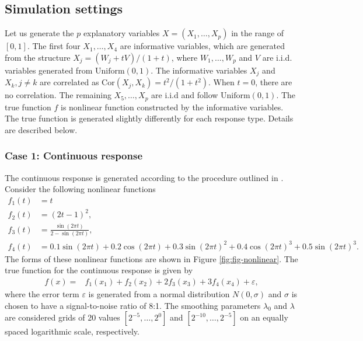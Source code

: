 \hypertarget{ssec5.1}{%
\subsection{Simulation settings}\label{ssec5.1}}

Let us generate the \(p\) explanatory variables \(X = (X_1, \dots, X_p)\) in the range of \([0,1]\). The first four \(X_1, \dots, X_4\) are informative variables, which are generated from the structure \(X_j = (W_j + tV) / (1 + t)\), where \(W_1, \dots, W_p\) and \(V\) are i.i.d. variables generated from \(\text{Uniform}(0, 1)\). The informative variables \(X_j\) and \(X_k, j \neq k\) are correlated as \(\text{Cor}(X_j,X_k)=t^2/(1+t^2)\). When \(t=0\), there are no correlation. The remaining \(X_5, \dots, X_p\) are i.i.d and follow \(\text{Uniform}(0, 1)\). The true function \(f\) is nonlinear function constructed by the informative variables. The true function is generated slightly differently for each response type. Details are described below.

\hypertarget{case-1-continuous-response}{%
\subsubsection{Case 1: Continuous response}\label{case-1-continuous-response}}

The continuous response is generated according to the procedure outlined in \citet{Zhang:2006}. Consider the following nonlinear functions
\begin{align*}
    f_1(t) &= t \\
    f_2(t) &= (2t - 1)^2, \\
    f_3(t) &= \frac{\sin(2 \pi t)}{2 - \sin(2 \pi t)}, \\
    f_4(t) &= 0.1\sin(2 \pi t) + 0.2\cos(2 \pi t) + 0.3\sin(2 \pi t)^2 + 0.4\cos(2 \pi t)^3 + 0.5\sin(2 \pi t)^3.
\end{align*}
The forms of these nonlinear functions are shown in Figure \ref{fig:fig-nonlinear}. The true function for the continuous response is given by
\begin{align}
    f(x) =&  f_1(x_1) + f_2(x_2) + 2 f_3(x_3) + 3 f_4(x_4) + \varepsilon,
    \label{eq:truef}
\end{align}
where the error term \(\varepsilon\) is generated from a normal distribution \(N(0, \sigma)\) and \(\sigma\) is chosen to have a signal-to-noise ratio of 8:1. The smoothing parameters \(\lambda_0\) and \(\lambda\) are considered grids of 20 values \([2^{-5}, \dots, 2^{0}]\) and \([2^{-10}, \dots, 2^{-5}]\) on an equally spaced logarithmic scale, respectively.

